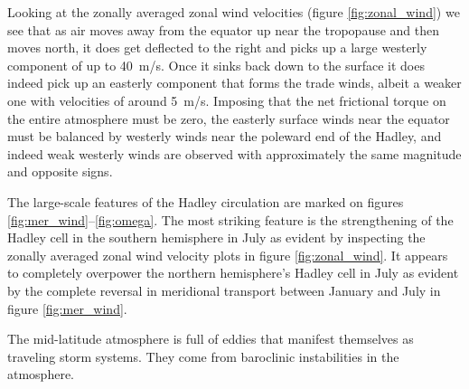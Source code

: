 \documentclass[11pt]{article}
\begin{document}
Looking at the zonally averaged zonal wind velocities (figure \ref{fig:zonal_wind}) we see that as air moves away from the equator up near the tropopause and then moves north, it does get deflected to the right and picks up a large westerly component of up to \SI{40}{\m/\s}. Once it sinks back down to the surface it does indeed pick up an easterly component that forms the trade winds, albeit a weaker one with velocities of around \SI{5}{\m/\s}. Imposing that the net frictional torque on the entire atmosphere must be zero, the easterly surface winds near the equator must be balanced by westerly winds near the poleward end of the Hadley, and indeed weak westerly winds are observed with approximately the same magnitude and opposite signs.

The large-scale features of the Hadley circulation are marked on figures \ref{fig:mer_wind}--\ref{fig:omega}. The most striking feature is the strengthening of the Hadley cell in the southern hemisphere in July as evident by inspecting the zonally averaged zonal wind velocity plots in figure \ref{fig:zonal_wind}. It appears to completely overpower the northern hemisphere's Hadley cell in July as evident by the complete reversal in meridional transport between January and July in figure \ref{fig:mer_wind}.

The mid-latitude atmosphere is full of eddies that manifest themselves as traveling storm systems. They come from baroclinic instabilities in the atmosphere.
\end{document}
